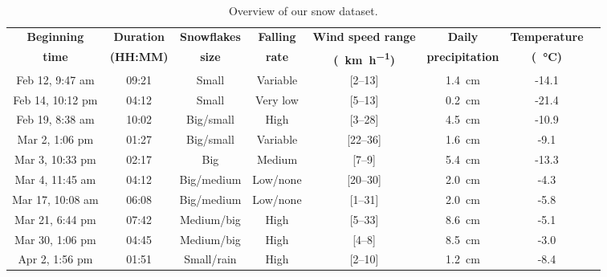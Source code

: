 \begin{table}[htbp]
    \centering
    \\
    \begin{tabular}{|c|c|c|c|c|c|c|c|}
        \hline
        \textbf{Beginning} & \textbf{Duration} & \textbf{Snowflakes} & \textbf{Falling} & \textbf{Wind speed range}      & \textbf{Daily}         & \textbf{Temperature}       \\
        \textbf{time}      & \textbf{(HH:MM)}  & \textbf{size}       & \textbf{rate}    & \textbf{(\SI{}{\km\per\hour})} & \textbf{precipitation} & \textbf{(\SI{}{\celsius})} \\\hline
        Feb 12, 9:47 am    &  09:21            & Small               & Variable         & [2--13]                         & \SI{1.4}{\cm}         & -14.1                      \\\hline
        Feb 14, 10:12 pm   &  04:12            & Small               & Very low         & [5--13]                         & \SI{0.2}{\cm}         & -21.4                      \\\hline
        Feb 19, 8:38 am    &  10:02            & Big/small           & High             & [3--28]                         & \SI{4.5}{\cm}         & -10.9                      \\\hline
        Mar 2, 1:06 pm     &  01:27            & Big/small           & Variable         & [22--36]                        & \SI{1.6}{\cm}         & -9.1                       \\\hline
        Mar 3, 10:33 pm    &  02:17            & Big                 & Medium           & [7--9]                          & \SI{5.4}{\cm}         & -13.3                      \\\hline
        Mar 4, 11:45 am    &  04:12            & Big/medium          & Low/none         & [20--30]                        & \SI{2.0}{\cm}         & -4.3                       \\\hline
        Mar 17, 10:08 am   &  06:08            & Big/medium          & Low/none         & [1--31]                         & \SI{2.0}{\cm}         & -5.8                       \\\hline
        Mar 21, 6:44 pm    &  07:42            & Medium/big          & High             & [5--33]                         & \SI{8.6}{\cm}         & -5.1                       \\\hline
        Mar 30, 1:06 pm    &  04:45            & Medium/big          & High             & [4--8]                          & \SI{8.5}{\cm}         & -3.0                       \\\hline
        Apr 2, 1:56 pm     &  01:51            & Small/rain          & High             & [2--10]                         & \SI{1.2}{\cm}         & -8.4                       \\\hline
    \end{tabular}
    \caption{Overview of our snow dataset.}
    \label{tab:overview-dataset}
\end{table}

